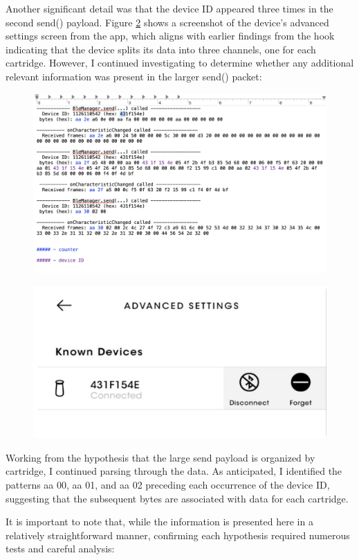 Another significant detail was that the device ID appeared three times in the second send() payload. Figure \ref{fig:deviceid} shows a screenshot of the device’s advanced settings screen from the app, which aligns with earlier findings from the hook indicating that the device splits its data into three channels, one for each cartridge. However, I continued investigating to determine whether any additional relevant information was present in the larger send() packet:

\begin{figure}[H]
	\centering
	\includegraphics[width=0.7\linewidth]{payload2}
	\caption{}
	\label{fig:payload2}
\end{figure}

\begin{figure}[H]
	\centering
	\includegraphics[width=0.7\linewidth]{device_id}
	\caption{}
	\label{fig:deviceid}
\end{figure}

Working from the hypothesis that the large send payload is organized by cartridge, I continued parsing through the data. As anticipated, I identified the patterns aa 00, aa 01, and aa 02 preceding each occurrence of the device ID, suggesting that the subsequent bytes are associated with data for each cartridge.

It is important to note that, while the information is presented here in a relatively straightforward manner, confirming each hypothesis required numerous tests and careful analysis:

